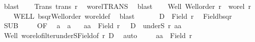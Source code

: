 \begin{isabellebody}
\ blast\isanewline
\ \ \isamarkupfalse%
\ Trans{\isacharcolon}{\kern0pt}\ {\isachardoublequoteopen}trans\ r{\isachardoublequoteclose}\ \isamarkupfalse%
\ wo{\isacharunderscore}{\kern0pt}rel{\isachardot}{\kern0pt}TRANS\ \isamarkupfalse%
\ blast\isanewline
\ \ \isamarkupfalse%
\ Well{\isacharprime}{\kern0pt}{\isacharcolon}{\kern0pt}\ {\isachardoublequoteopen}Well{\isacharunderscore}{\kern0pt}order\ {\isacharquery}{\kern0pt}r{\isacharprime}{\kern0pt}\ {\isasymand}\ wo{\isacharunderscore}{\kern0pt}rel\ {\isacharquery}{\kern0pt}r{\isacharprime}{\kern0pt}{\isachardoublequoteclose}\isanewline
\ \ \isamarkupfalse%
\ WELL\ bsqr{\isacharunderscore}{\kern0pt}Well{\isacharunderscore}{\kern0pt}order\ wo{\isacharunderscore}{\kern0pt}rel{\isacharunderscore}{\kern0pt}def\ \isamarkupfalse%
\ blast\isanewline
\ \ \isanewline
\ \ \isamarkupfalse%
\ {\isachardoublequoteopen}D\ {\isacharless}{\kern0pt}\ Field\ {\isacharquery}{\kern0pt}r{\isacharprime}{\kern0pt}{\isachardoublequoteclose}\ \isamarkupfalse%
\ Field{\isacharunderscore}{\kern0pt}bsqr\ \isamarkupfalse%
\ SUB\ \isacommand{{\isachardot}{\kern0pt}}\isamarkupfalse%
\isanewline
\ \ \isamarkupfalse%
\ OF\ \isamarkupfalse%
\ a{}\ \ a{}\ \isanewline
\ \ {\isachardoublequoteopen}{\isacharparenleft}{\kern0pt}a{}{\isacharcomma}{\kern0pt}a{}{\isacharparenright}{\kern0pt}\ {\isasymin}\ Field\ {\isacharquery}{\kern0pt}r{\isacharprime}{\kern0pt}{\isachardoublequoteclose}\ \ {}{\isacharcolon}{\kern0pt}\ {\isachardoublequoteopen}D\ {\isacharequal}{\kern0pt}\ underS\ {\isacharquery}{\kern0pt}r{\isacharprime}{\kern0pt}\ {\isacharparenleft}{\kern0pt}a{}{\isacharcomma}{\kern0pt}a{}{\isacharparenright}{\kern0pt}{\isachardoublequoteclose}\isanewline
\ \ \isamarkupfalse%
\ Well{\isacharprime}{\kern0pt}\ wo{\isacharunderscore}{\kern0pt}rel{\isachardot}{\kern0pt}ofilter{\isacharunderscore}{\kern0pt}underS{\isacharunderscore}{\kern0pt}Field{\isacharbrackleft}{\kern0pt}of\ {\isacharquery}{\kern0pt}r{\isacharprime}{\kern0pt}\ D{\isacharbrackright}{\kern0pt}\ \isamarkupfalse%
\ auto\isanewline
\ \ \isamarkupfalse%
\ {}{\isacharcolon}{\kern0pt}\ {\isachardoublequoteopen}{\isacharbraceleft}{\kern0pt}a{}{\isacharcomma}{\kern0pt}a{}{\isacharbraceright}{\kern0pt}\ {\isasymle}\ Field\ r{\isachardoublequoteclose}\ \isamarkupfalse%

\end{isabellebody}
